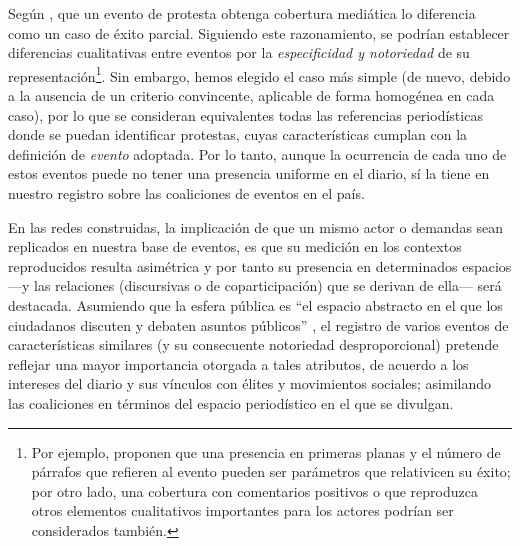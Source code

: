 \documentclass[letterpaper, 11pt]{book}
\theoremstyle{definition}
\theoremstyle{remark}
\begin{document}
Según \citet{2003_Wada_Tesis}, que un evento de protesta obtenga cobertura mediática lo diferencia como un caso de éxito parcial. 
Siguiendo este razonamiento, se podrían establecer diferencias cualitativas entre eventos por la \emph{especificidad y notoriedad} de su representación\footnote{
    Por ejemplo, \citet{2012_Wand_andSoule_ColabiracionOMS} proponen que una presencia en primeras planas y el número de párrafos que refieren al evento pueden ser parámetros que relativicen su éxito; por otro lado, una cobertura con comentarios positivos o que reproduzca otros elementos cualitativos importantes para los actores podrían ser considerados también. 
}. 
Sin embargo, hemos elegido el caso más simple (de nuevo, debido a la ausencia de un criterio convincente, aplicable de forma homogénea en cada caso), por lo que se consideran equivalentes todas las referencias periodísticas donde se puedan identificar protestas, cuyas características cumplan con la definición de \emph{evento} adoptada. 
Por lo tanto, aunque la ocurrencia de cada uno de estos eventos puede no tener una presencia uniforme en el diario, sí la tiene en nuestro registro sobre las coaliciones de eventos en el país. 


En las redes construidas, la implicación de que un mismo actor o demandas sean replicados en nuestra base de eventos, es que su medición en los contextos reproducidos resulta asimétrica y por tanto su presencia en determinados espacios ---y las relaciones (discursivas o de coparticipación) que se derivan de ella--- será destacada. 
Asumiendo que la esfera pública es ``el espacio abstracto en el que los ciudadanos discuten y debaten asuntos públicos'' \citep[38]{1999_OliverMyers_LocalNewspapers}, el registro de varios eventos de características similares (y su consecuente notoriedad desproporcional) pretende reflejar una mayor importancia otorgada a tales atributos, de acuerdo a los intereses del diario y sus vínculos con élites y movimientos sociales; asimilando las coaliciones en términos del espacio periodístico en el que se divulgan. 
\end{document}
